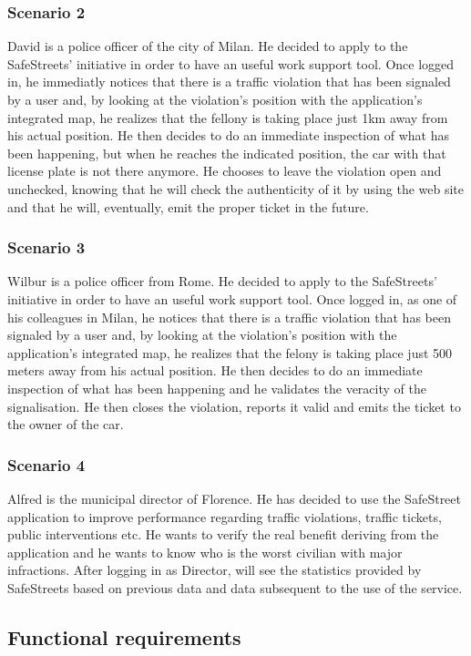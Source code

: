 \documentclass{article}
\begin{document}
\subsubsection{Scenario 2}
David is a police officer of the city of Milan. He decided to apply to the
SafeStreets’ initiative in order to have an useful work support tool. Once
logged in, he immediatly notices that there is a traffic violation that has been
signaled by a user and, by looking at the violation’s position with the
application’s integrated map, he realizes that the fellony is taking place just
1km away from his actual position. He then decides to do an immediate inspection
of what has been happening, but when he reaches the indicated position, the car
with that license plate is not there anymore. He chooses to leave the violation
open and unchecked, knowing that he will check the authenticity of it by using
the web site and that he will, eventually, emit the proper ticket in the future.
\subsubsection{Scenario 3}
Wilbur is a police officer from Rome. He decided to
apply to the SafeStreets’ initiative in order to have an useful work support
tool. Once logged in, as one of his colleagues in Milan, he notices that there
is a traffic violation that has been signaled by a user and, by looking at the
violation’s position with the application’s integrated map, he realizes that the
felony is taking place just 500 meters away from his actual position. He then
decides to do an immediate inspection of what has been happening and he
validates the veracity of the signalisation. He then closes the violation,
reports it valid and emits the ticket to the owner of the car.
\subsubsection{Scenario 4}
Alfred is the municipal director of Florence. He has decided to use the SafeStreet 
application to improve performance regarding traffic violations, traffic tickets, 
public interventions etc.
He wants to verify the real benefit deriving from the application and he wants to know
who is the worst civilian with major infractions. 
After logging in as Director, will see the statistics provided by SafeStreets based 
on previous data and data subsequent to the use of the service.

\newpage
\subsection{Functional requirements}
\end{document}
